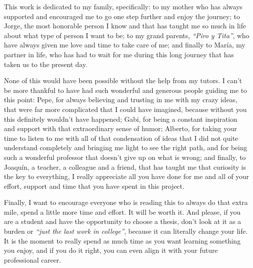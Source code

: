 \documentclass[11pt,english,a4paper,hidelinks]{book}
\begin{document}
\noindent This work is dedicated to my family, specifically: to my mother who has always supported and encouraged me to go one step further and enjoy the journey; to Jorge, the most honorable person I know and that has taught me so much in life about what type of person I want to be; to my grand parents, \textit{``Piro y Tita''}, who have always given me love and time to take care of me; and finally to María, my partner in life, who has had to wait for me during this long journey that has taken us to the present day.

\vspace{0.5cm}
\noindent None of this would have been possible without the help from my tutors. I can't be more thankful to have had such wonderful and generous people guiding me to this point: Pepe, for always believing and trusting in me with my crazy ideas, that were far more complicated that I could have imagined, because without you this definitely wouldn't have happened; Gabi, for being a constant inspiration and support with that extraordinary sense of humor; Alberto, for taking your time to listen to me with all of that condensation of ideas that I did not quite understand completely and bringing me light to see the right path, and for being such a wonderful professor that doesn't give up on what is wrong; and finally, to Joaquín, a teacher, a colleague and a friend, that has taught me that curiosity is the key to everything, I really appreciate all you have done for me and all of your effort, support and time that you have spent in this project.

\vspace{0.5cm}
\noindent Finally, I want to encourage everyone who is reading this to always do that extra mile, spend a little more time and effort. It will be worth it. And please, if you are a student and have the opportunity to choose a thesis, don't look at it as a burden or \textit{``just the last work in college''}, because it can literally change your life. It is the moment to really spend as much time as you want learning something you enjoy, and if you do it right, you can even align it with your future professional career.

\tableofcontents
\newpage

\listoffigures
\newpage
\end{document}
